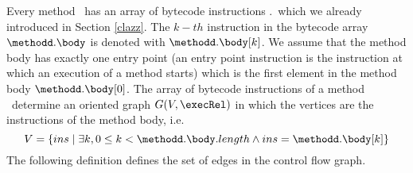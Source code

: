Every method \methodd \ has an array of bytecode instructions \methodd.\body \  which we already introduced in Section \ref{clazz}.
The $k-th$ instruction in the bytecode array $\methodd.\body$ is  denoted with $\methodd.\body[k]$.
 We assume that the method body has exactly one entry point
 (an entry point instruction is the instruction at which an execution of a method starts) which is the first
 element in the method body
$\methodd.\body[0]$.
The array of bytecode instructions of a method \methodd \ determine an oriented graph $G( V , \execRel ) $ in which the vertices are the instructions of the method body,
i.e. $$ V = \{ ins \mid \exists k,  0 \leq k < \methodd.\body.length \wedge ins = \methodd.\body[k] \}$$
The following definition defines the set of edges in the control flow graph.
